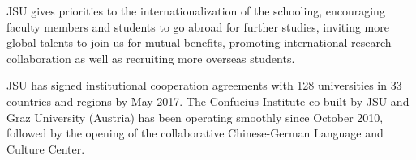 \begin{englishabstract}
JSU gives priorities to the internationalization of the schooling, encouraging faculty members and students to go abroad for further studies, inviting more global talents to join us for mutual benefits, promoting international research collaboration as well as recruiting more overseas students.

JSU has signed institutional cooperation agreements with 128 universities in 33 countries and regions by May 2017. The Confucius Institute co-built by JSU and Graz University (Austria) has been operating smoothly since October 2010, followed by the opening of the collaborative Chinese-German Language and Culture Center.

\end{englishabstract}

